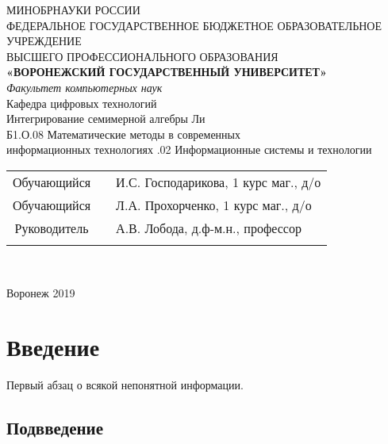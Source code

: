 \documentclass[a4paper]{article}
\begin{document}

\begin{center}
\hfill \break
\large{МИНОБРНАУКИ РОССИИ}\\
\footnotesize{ФЕДЕРАЛЬНОЕ ГОСУДАРСТВЕННОЕ БЮДЖЕТНОЕ ОБРАЗОВАТЕЛЬНОЕ УЧРЕЖДЕНИЕ}\\
\footnotesize{ВЫСШЕГО ПРОФЕССИОНАЛЬНОГО ОБРАЗОВАНИЯ}\\
\small{\textbf{«ВОРОНЕЖСКИЙ ГОСУДАРСТВЕННЫЙ УНИВЕРСИТЕТ»}}\\
\hfill \break
\textit{Факультет компьютерных наук}\\
 \hfill \break
\normalsize{Кафедра цифровых технологий}\\
\hfill\break
\hfill \break
\hfill \break
\hfill \break
\large{Интегрирование семимерной алгебры Ли}\\
\hfill \break
\hfill \break
\hfill \break
\normalsize{Б1.О.08 Математические методы в современных\\\hfill информационных технологиях
\hfill {}.02 Информационные системы и технологии}\\
\hfill \break
\hfill \break
\hfill \break
\hfill \break
\hfill \break
\hfill \break
\hfill \break
\hfill \break
\hfill \break
\end{center}

\normalsize{
\begin{tabular}{ccl}
Обучающийся & \underline{\hspace{3cm}} &И.С. Господарикова, 1 курс маг., д/о\\
Обучающийся & \underline{\hspace{3cm}} &Л.А. Прохорченко, 1 курс маг., д/о\\
Руководитель & \underline{\hspace{3cm}}&А.В. Лобода, д.ф-м.н., профессор \\\\
\end{tabular}
}\\
\hfill \break
\hfill \break
\hfill \break
\hfill \break
\hfill \break
\hfill \break
\hfill \break
\begin{center} Воронеж 2019 \end{center}
\thispagestyle{empty} %


\newpage

    \tableofcontents %
\newpage

\newpage
\section{Введение}
Первый абзац о \cite{Vasylenko92} всякой непонятной \cite{Afanasyev92} информации.
\newpage

\subsection{Подвведение}
\newpage


\end{document}
